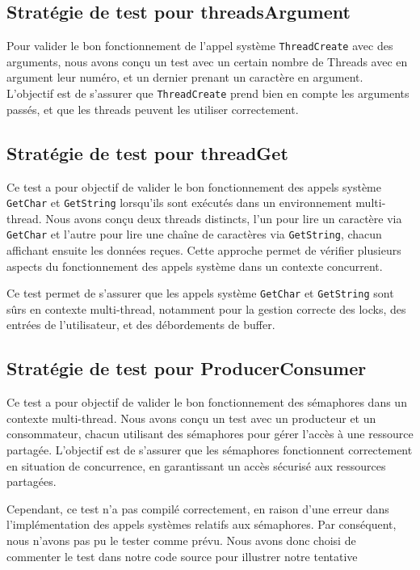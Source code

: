 \documentclass[a4paper,11pt]{article}
\begin{document}
\subsection{Stratégie de test pour threadsArgument}

Pour valider le bon fonctionnement de l'appel système \texttt{ThreadCreate} avec des arguments, nous avons conçu un test avec un certain nombre de Threads avec en argument leur numéro, et un dernier prenant un caractère en argument. 
L'objectif est de s'assurer que \texttt{ThreadCreate} prend bien en compte les arguments passés, et que les threads peuvent les utiliser correctement.

\subsection{Stratégie de test pour threadGet}
Ce test a pour objectif de valider le bon fonctionnement des appels système \texttt{GetChar} et \texttt{GetString} lorsqu'ils sont exécutés dans un environnement multi-thread. Nous avons conçu deux threads distincts, l'un pour lire un caractère via \texttt{GetChar} et l'autre pour lire une chaîne de caractères via \texttt{GetString}, chacun affichant ensuite les données reçues. Cette approche permet de vérifier plusieurs aspects du fonctionnement des appels système dans un contexte concurrent.

Ce test permet de s'assurer que les appels système \texttt{GetChar} et \texttt{GetString} sont sûrs en contexte multi-thread, notamment pour la gestion correcte des locks, des entrées de l'utilisateur, et des débordements de buffer.

\subsection{Stratégie de test pour ProducerConsumer}
Ce test a pour objectif de valider le bon fonctionnement des sémaphores dans un contexte multi-thread. Nous avons conçu un test avec un producteur et un consommateur, chacun utilisant des sémaphores pour gérer l'accès à une ressource partagée. L'objectif est de s'assurer que les sémaphores fonctionnent correctement en situation de concurrence, en garantissant un accès sécurisé aux ressources partagées.

Cependant, ce test n'a pas compilé correctement, en raison d'une erreur dans l'implémentation des appels systèmes relatifs aux sémaphores. Par conséquent, nous n'avons pas pu le tester comme prévu. Nous avons donc choisi de commenter le test dans notre code source pour illustrer notre tentative
\end{document}
